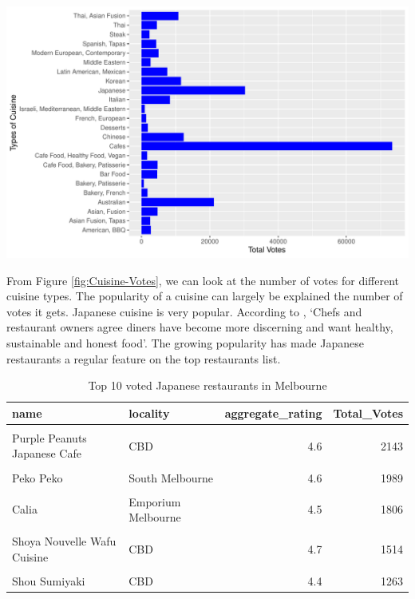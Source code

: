 \documentclass[11pt,a4paper,]{article}
\let\origfigure\figure
\let\endorigfigure\endfigure
\renewenvironment{figure}[1][2] {
    \expandafter\origfigure\expandafter[H]
} {
    \endorigfigure
}%
\begin{document}
\begin{figure}
\centering
\includegraphics{assignment4_files/figure-latex/Cuisine-Votes-1.pdf}
\caption{\label{fig:Cuisine-Votes}Number of Votes for different Cuisines in Melbourne}
\end{figure}

From Figure \ref{fig:Cuisine-Votes}, we can look at the number of votes for different cuisine types. The popularity of a cuisine can largely be explained the number of votes it gets. Japanese cuisine is very popular. According to \textcite{ATR}, `Chefs and restaurant owners agree diners have become more discerning and want healthy, sustainable and honest food'. The growing popularity has made Japanese restaurants a regular feature on the top restaurants list.

\begin{table}[!h]

\caption{\label{tab:top10-Jap}Top 10 voted Japanese restaurants in Melbourne}
\centering
\begin{tabular}[t]{llrr}
\toprule
name & locality & aggregate\_rating & Total\_Votes\\
\midrule
\cellcolor{gray!6}{Hakata Gensuke Ramen Professionals} & \cellcolor{gray!6}{CBD} & \cellcolor{gray!6}{4.7} & \cellcolor{gray!6}{2337}\\
Purple Peanuts Japanese Cafe & CBD & 4.6 & 2143\\
\cellcolor{gray!6}{Mr. Miyagi} & \cellcolor{gray!6}{Windsor} & \cellcolor{gray!6}{4.7} & \cellcolor{gray!6}{2024}\\
Peko Peko & South Melbourne & 4.6 & 1989\\
\cellcolor{gray!6}{Sakura Kaiten Sushi} & \cellcolor{gray!6}{CBD} & \cellcolor{gray!6}{4.6} & \cellcolor{gray!6}{1856}\\
\addlinespace
Calia & Emporium Melbourne & 4.5 & 1806\\
\cellcolor{gray!6}{Shira Nui} & \cellcolor{gray!6}{Glen Waverley} & \cellcolor{gray!6}{4.8} & \cellcolor{gray!6}{1633}\\
Shoya Nouvelle Wafu Cuisine & CBD & 4.7 & 1514\\
\cellcolor{gray!6}{Kisumé} & \cellcolor{gray!6}{CBD} & \cellcolor{gray!6}{4.5} & \cellcolor{gray!6}{1346}\\
Shou Sumiyaki & CBD & 4.4 & 1263\\
\bottomrule
\end{tabular}
\end{table}
\end{document}
